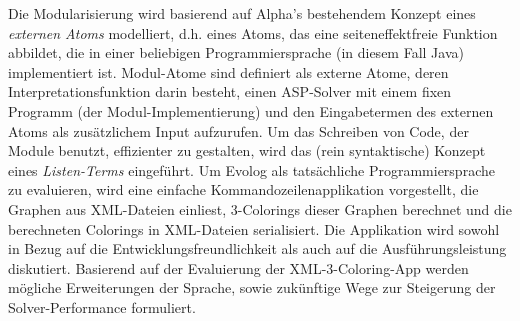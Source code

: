 \documentclass[draft,final]{vutinfth} %
\theoremstyle{definition}
\begin{document}
\begin{kurzfassung}
  Die Modularisierung wird basierend auf Alpha's bestehendem Konzept eines \emph{externen Atoms} modelliert, d.h. eines Atoms, das eine seiteneffektfreie Funktion abbildet, die in einer beliebigen Programmiersprache (in diesem Fall Java) implementiert ist. Modul-Atome sind definiert als externe Atome, deren Interpretationsfunktion darin besteht, einen ASP-Solver mit einem fixen Programm (der Modul-Implementierung) und den Eingabetermen des externen Atoms als zusätzlichem Input aufzurufen. Um das Schreiben von Code, der Module benutzt, effizienter zu gestalten, wird das (rein syntaktische) Konzept eines \emph{Listen-Terms} eingeführt.
  Um Evolog als tatsächliche Programmiersprache zu evaluieren, wird eine einfache Kommandozeilenapplikation vorgestellt, die Graphen aus XML-Dateien einliest, 3-Colorings dieser Graphen berechnet und die berechneten Colorings in XML-Dateien serialisiert. Die Applikation wird sowohl in Bezug auf die Entwicklungsfreundlichkeit als auch auf die Ausführungsleistung diskutiert. Basierend auf der Evaluierung der XML-3-Coloring-App werden mögliche Erweiterungen der Sprache, sowie zukünftige Wege zur Steigerung der Solver-Performance formuliert.
\end{kurzfassung}
\end{document}
